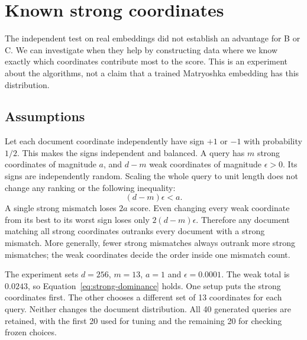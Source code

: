 \section{Known strong coordinates}
\label{sec:controlled}
The independent test on real embeddings did not establish an advantage for B or C.
We can investigate when they help by constructing data where we know exactly which
coordinates contribute most to the score. This is an experiment about the algorithms, not a
claim that a trained Matryoshka embedding has this distribution.

\subsection{Assumptions}
Let each document coordinate independently have sign $+1$ or
$-1$ with probability $1/2$. This makes the signs independent and balanced. A query has $m$ strong coordinates of magnitude $a$, and
$d-m$ weak coordinates of magnitude $\epsilon>0$. Its signs are independently random.
Scaling the whole query to unit length does not change any ranking or the following inequality:
\begin{equation}
(d-m)\epsilon<a.
\label{eq:strong-dominance}
\end{equation}
A single strong mismatch loses $2a$ score. Even changing every weak coordinate from its best
to its worst sign loses only $2(d-m)\epsilon$. Therefore any document matching all strong
coordinates outranks every document with a strong mismatch. More generally, fewer strong
mismatches always outrank more strong mismatches; the weak coordinates decide the order inside
one mismatch count.

The experiment sets $d=256$, $m=13$, $a=1$ and $\epsilon=0.0001$. The weak total is $0.0243$,
so Equation~\eqref{eq:strong-dominance} holds. One setup puts the strong coordinates first.
The other chooses a different set of 13 coordinates for each query. Neither changes the document
distribution. All 40 generated queries are retained, with the first 20 used for tuning and the
remaining 20 for checking frozen choices.

